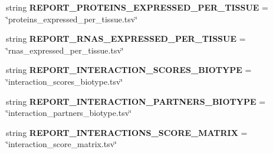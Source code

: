 \begin{DoxyCompactItemize}
\item 
\hypertarget{classsrc_1_1fr_1_1tagc_1_1rainet_1_1core_1_1execution_1_1AnalysisStrategy_1_1AnalysisStrategy_a13c7700025c615387b9b51122fc39c67}{string {\bfseries R\-E\-P\-O\-R\-T\-\_\-\-P\-R\-O\-T\-E\-I\-N\-S\-\_\-\-E\-X\-P\-R\-E\-S\-S\-E\-D\-\_\-\-P\-E\-R\-\_\-\-T\-I\-S\-S\-U\-E} = \char`\"{}proteins\-\_\-expressed\-\_\-per\-\_\-tissue.\-tsv\char`\"{}}\label{classsrc_1_1fr_1_1tagc_1_1rainet_1_1core_1_1execution_1_1AnalysisStrategy_1_1AnalysisStrategy_a13c7700025c615387b9b51122fc39c67}

\item 
\hypertarget{classsrc_1_1fr_1_1tagc_1_1rainet_1_1core_1_1execution_1_1AnalysisStrategy_1_1AnalysisStrategy_a2e8330a93ba684a2915ee4d402b579a3}{string {\bfseries R\-E\-P\-O\-R\-T\-\_\-\-R\-N\-A\-S\-\_\-\-E\-X\-P\-R\-E\-S\-S\-E\-D\-\_\-\-P\-E\-R\-\_\-\-T\-I\-S\-S\-U\-E} = \char`\"{}rnas\-\_\-expressed\-\_\-per\-\_\-tissue.\-tsv\char`\"{}}\label{classsrc_1_1fr_1_1tagc_1_1rainet_1_1core_1_1execution_1_1AnalysisStrategy_1_1AnalysisStrategy_a2e8330a93ba684a2915ee4d402b579a3}

\item 
\hypertarget{classsrc_1_1fr_1_1tagc_1_1rainet_1_1core_1_1execution_1_1AnalysisStrategy_1_1AnalysisStrategy_a3d3103dff33b0add702eff9256a936a6}{string {\bfseries R\-E\-P\-O\-R\-T\-\_\-\-I\-N\-T\-E\-R\-A\-C\-T\-I\-O\-N\-\_\-\-S\-C\-O\-R\-E\-S\-\_\-\-B\-I\-O\-T\-Y\-P\-E} = \char`\"{}interaction\-\_\-scores\-\_\-biotype.\-tsv\char`\"{}}\label{classsrc_1_1fr_1_1tagc_1_1rainet_1_1core_1_1execution_1_1AnalysisStrategy_1_1AnalysisStrategy_a3d3103dff33b0add702eff9256a936a6}

\item 
\hypertarget{classsrc_1_1fr_1_1tagc_1_1rainet_1_1core_1_1execution_1_1AnalysisStrategy_1_1AnalysisStrategy_ab364e8bc96e50882f673acf510ad6d9d}{string {\bfseries R\-E\-P\-O\-R\-T\-\_\-\-I\-N\-T\-E\-R\-A\-C\-T\-I\-O\-N\-\_\-\-P\-A\-R\-T\-N\-E\-R\-S\-\_\-\-B\-I\-O\-T\-Y\-P\-E} = \char`\"{}interaction\-\_\-partners\-\_\-biotype.\-tsv\char`\"{}}\label{classsrc_1_1fr_1_1tagc_1_1rainet_1_1core_1_1execution_1_1AnalysisStrategy_1_1AnalysisStrategy_ab364e8bc96e50882f673acf510ad6d9d}

\item 
\hypertarget{classsrc_1_1fr_1_1tagc_1_1rainet_1_1core_1_1execution_1_1AnalysisStrategy_1_1AnalysisStrategy_aac6522a8d987e324837ee96dfc50d34b}{string {\bfseries R\-E\-P\-O\-R\-T\-\_\-\-I\-N\-T\-E\-R\-A\-C\-T\-I\-O\-N\-S\-\_\-\-S\-C\-O\-R\-E\-\_\-\-M\-A\-T\-R\-I\-X} = \char`\"{}interaction\-\_\-score\-\_\-matrix.\-tsv\char`\"{}}\label{classsrc_1_1fr_1_1tagc_1_1rainet_1_1core_1_1execution_1_1AnalysisStrategy_1_1AnalysisStrategy_aac6522a8d987e324837ee96dfc50d34b}


\end{DoxyCompactItemize}
